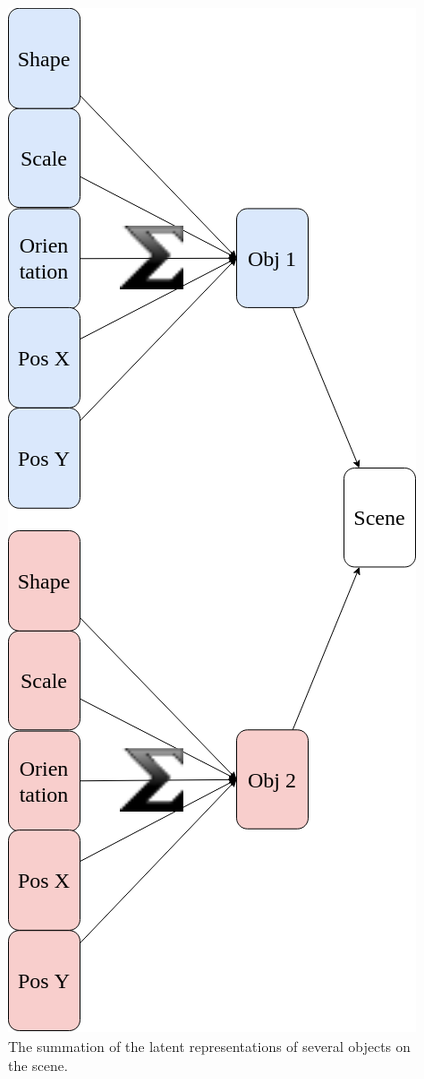 \documentclass{article}
\begin{document}
\begin{figure}[ht]{\linewidth}
\begin{minipage}[b]{0.48\textwidth}
            \includegraphics[width=\textwidth]{img/model/multiple_objects_on_scene}
            \caption{The summation of the latent representations of several objects on the scene.}
            \label{fig:multiple_objects_on_scene}
        \end{minipage}
    \end{figure}
\end{document}
